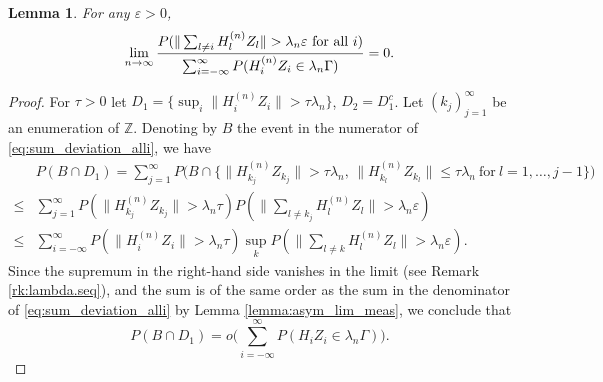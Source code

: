\documentclass[11pt,reqno]{amsart}
\numberwithin{equation}{section}
\newtheorem{lemma}{Lemma}[section] %
\theoremstyle{definition}
\theoremstyle{remark}
\theoremstyle{definition}
\newcommand{\eps}{\varepsilon}
\newcommand{\ZZ}{\mathbb{Z}}
\newcommand{\bbz}{\ZZ}
\begin{document}
\begin{lemma}\label{lemma:prob_equi_sumDeviation} For any $\eps>0$, 
 \begin{equation}\label{eq:sum_deviation_alli}
     \lim_{n\to \infty} \frac{P(\|\sum_{l\neq i} H_l^{(n)} Z_l\| >
       \lambda_n \eps \ \text{\rm for all} \ i)}{\sum_{i  =
         -\infty}^\infty P(H_i^{(n)}Z_i\in\lambda_n \Gamma)} = 0. 
 \end{equation}
\end{lemma}
\begin{proof}
  For $\tau>0$ let $D_1 = \{\sup_i \|H_i^{(n)} Z_i\| >  \tau
  \lambda_n \}$, $D_2= D_1^c$. Let $(k_j)_{j=1}^\infty$ be an
  enumeration of $\bbz$. Denoting by $B$ the event in the numerator of
  \eqref{eq:sum_deviation_alli}, we have 
 \begin{align*}
   &P( B\cap D_1) = \sum_{j=1}^\infty P\bigl( B\cap\{ \|H_{k_j}^{(n)} Z_{k_j}\| >  \tau
  \lambda_n , \, \|H_{k_l}^{(n)} Z_{k_l}\| \leq  \tau
  \lambda_n \ \text{for} \ l=1,\ldots, j-1\}\bigr)\\
\leq& \sum_{j=1}^\infty  P(\|H_{k_j}^{(n)} Z_{k_j}\| > \lambda_n \tau)
      P(\|\sum_{l\neq {k_j}} H_l^{(n)} Z_l\| > \lambda_n \eps)\\
 \leq& \sum_{i  =
         -\infty}^\infty P(\|H_i^{(n)}Z_i\|>\lambda_n \tau) \sup_k
   P(\|\sum_{l\neq {k}} H_l^{(n)} Z_l\| > \lambda_n \eps). 
 \end{align*}
Since the supremum in the right-hand side vanishes in the limit (see 
Remark \ref{rk:lambda.seq}), and the sum is of the same order as
the sum in the denominator of \eqref{eq:sum_deviation_alli} by
Lemma \ref{lemma:asym_lim_meas}, we conclude that
$$
P(B\cap D_1) = o\bigl( \sum_{i  =
  -\infty}^\infty P(H_iZ_i\in\lambda_n \Gamma)\bigr).
$$


\end{proof}
\end{document}
